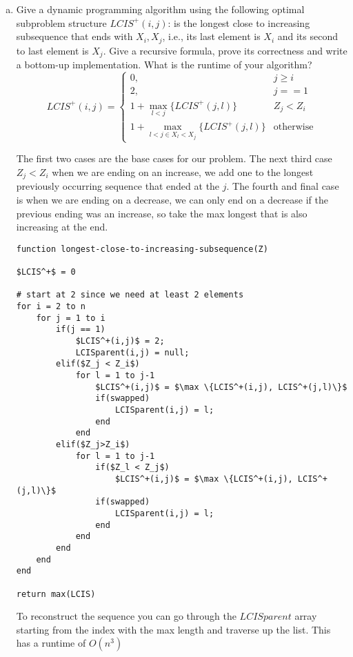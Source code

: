\documentclass{article}
\begin{document}
\begin{enumerate}[a)]
\item Give a dynamic programming algorithm using the following optimal subproblem structure $LCIS^{+}(i,j)$: is the longest close to increasing subsequence that ends with $X_i,X_j$, i.e., its last element is $X_i$ and its second to last element is $X_j$.
Give a recursive formula, prove its correctness and write a bottom-up implementation.
What is the runtime of your algorithm? \\

\[
    LCIS^+(i,j) =
\begin{cases}
    0,                                          & j \geq i      \\
    2,                                          & j == 1        \\
    1 + \max_{l < j}\{LCIS^+(j,l)\}             & Z_j < Z_i     \\
    1 + \max_{l<j \in X_l<X_j} \{LCIS^+(j,l)\}  & \text{otherwise}
\end{cases}
\]

The first two cases are the base cases for our problem.
The next third case $Z_j < Z_i$ when we are ending on an increase, we add one to the longest previously occurring sequence that ended at the $j$.
The fourth and final case is when we are ending on a decrease, we can only end on a decrease if the previous ending was an increase, so take the max longest that is also increasing at the end.

\begin{lstlisting}
function longest-close-to-increasing-subsequence(Z)

$LCIS^+$ = 0

# start at 2 since we need at least 2 elements
for i = 2 to n
    for j = 1 to i
        if(j == 1)
            $LCIS^+(i,j)$ = 2;
            LCISparent(i,j) = null;
        elif($Z_j < Z_i$)
            for l = 1 to j-1
                $LCIS^+(i,j)$ = $\max \{LCIS^+(i,j), LCIS^+(j,l)\}$
                if(swapped)
                    LCISparent(i,j) = l;
                end
            end
        elif($Z_j>Z_i$)
            for l = 1 to j-1
                if($Z_l < Z_j$)
                    $LCIS^+(i,j)$ = $\max \{LCIS^+(i,j), LCIS^+(j,l)\}$
                if(swapped)
                    LCISparent(i,j) = l;
                end
            end
        end
    end
end

return max(LCIS)
\end{lstlisting}
To reconstruct the sequence you can go through the $LCISparent$ array starting from the index with the max length and traverse up the list.
This has a runtime of $O(n^3)$




\end{enumerate}
\end{document}
